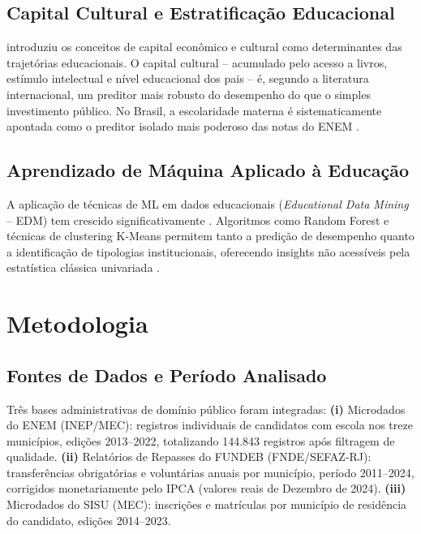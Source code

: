 \documentclass[12pt]{article}
\begin{document}
\subsection{Capital Cultural e Estratificação Educacional}

\cite{bourdieu1986} introduziu os conceitos de capital econômico e cultural como
determinantes das trajetórias educacionais. O capital cultural -- acumulado pelo acesso
a livros, estímulo intelectual e nível educacional dos pais -- é, segundo a literatura
internacional, um preditor mais robusto do desempenho do que o simples investimento
público. No Brasil, a escolaridade materna é sistematicamente apontada como o preditor
isolado mais poderoso das notas do ENEM \cite{soaresalves2013}.

\subsection{Aprendizado de Máquina Aplicado à Educação}

A aplicação de técnicas de ML em dados educacionais (\textit{Educational Data Mining} --
EDM) tem crescido significativamente \cite{james2023}. Algoritmos como Random Forest e
técnicas de clustering K-Means permitem tanto a predição de desempenho quanto a
identificação de tipologias institucionais, oferecendo insights não acessíveis pela
estatística clássica univariada \cite{geron2022}.

\section{Metodologia}
\label{sec:metodologia}

\subsection{Fontes de Dados e Período Analisado}

Três bases administrativas de domínio público foram integradas:
\textbf{(i)} Microdados do ENEM (INEP/MEC): registros individuais de candidatos com
escola nos treze municípios, edições 2013--2022, totalizando 144.843 registros após
filtragem de qualidade.
\textbf{(ii)} Relatórios de Repasses do FUNDEB (FNDE/SEFAZ-RJ): transferências
obrigatórias e voluntárias anuais por município, período 2011--2024, corrigidos monetariamente pelo IPCA (valores reais de Dezembro de 2024).
\textbf{(iii)} Microdados do SISU (MEC): inscrições e matrículas por município de
residência do candidato, edições 2014--2023.
\end{document}
